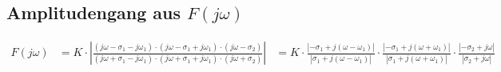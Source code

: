 \subsection{Amplitudengang aus $F\left(j\omega\right)$}
\begin{align}
F(j\omega)&=K\cdot\left|\frac{(j\omega-\sigma_1-j\omega_1)\cdot(j\omega-\sigma_1+j\omega_1)\cdot(j\omega-\sigma_2)}{(j\omega+\sigma_1-j\omega_1)\cdot(j\omega+\sigma_1+j\omega_1)\cdot(j\omega+\sigma_2)}\right| 
&= K \cdot \frac{\left|-\sigma_1+j\left(\omega-\omega_1\right)\right|}{\left|\sigma_1+j\left(\omega-\omega_1\right)\right|} \cdot \frac{\left|-\sigma_1+j\left(\omega+\omega_1\right)\right|}{\left|\sigma_1+j\left(\omega+\omega_1\right)\right|} \cdot \frac{\left|-\sigma_2+j\omega\right|}{\left|\sigma_2+j\omega\right|} \nonumber
\end{align}

